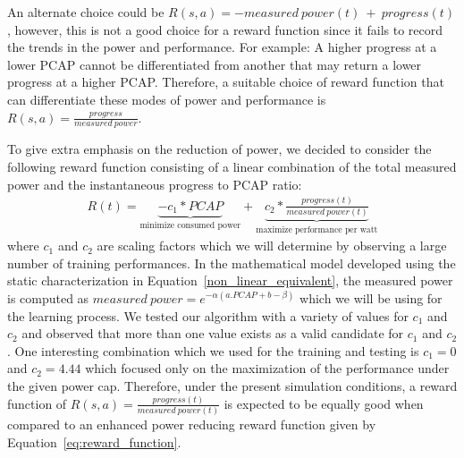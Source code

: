 An alternate choice could be $R(s,a) = - measured \ power(t) \ + \ progress(t)$, however, this is not a good choice for a reward function since it fails to record the trends in the power and performance. For example: A higher progress at a lower PCAP cannot be differentiated from another that may return a lower progress at a higher PCAP. Therefore, a suitable choice of reward function that can differentiate these modes of power and performance is $R(s,a) = \frac{progress}{measured \ power}$.   

To give extra emphasis on the reduction of power, we decided to consider the following reward function consisting of a linear combination of the total measured power and the instantaneous progress to PCAP ratio:
\begin{equation}
                \begin{aligned}
                            R(t) = \underbrace{-c_1* PCAP}_{\text{minimize consumed power}} + \underbrace{c_2 * \frac{progress(t)}{measured \ power (t)}}_{\text{maximize performance per watt}}
                \end{aligned}
                \label{eq:reward_function}
            \end{equation}
where $c_1$ and $c_2$ are scaling factors which we will determine by observing a large number of training performances. In the mathematical model developed using the static characterization in Equation~\ref{non_linear_equivalent}, the measured power is computed as $measured \ power = e^{-\alpha(a.PCAP+b-\beta)}$ which we will be using for the learning process.  
We tested our algorithm with a variety of values for $c_1$ and $c_2$ and observed that more than one value exists as a valid candidate for $c_1$ and $c_2$. One interesting combination which we used for the training and testing is $c_1 = 0$ and $c_2 = 4.44$ which focused only on the maximization of the performance under the given power cap. Therefore, under the present simulation conditions, a reward function of $R(s,a) = \frac{progress(t)}{measured \ power (t)}$ is expected to be equally good when compared to an enhanced power reducing reward function given by Equation~\ref{eq:reward_function}.

